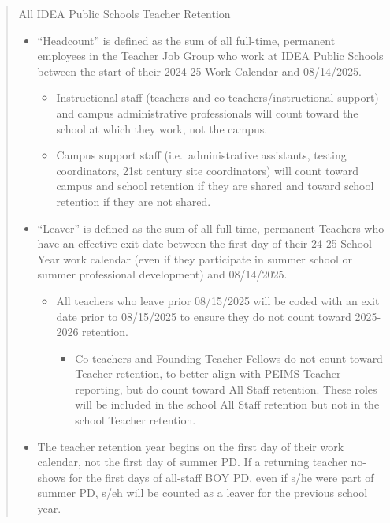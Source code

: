 \documentclass[
  letterpaper,
  DIV=11,
  numbers=noendperiod]{scrreprt}
\providecommand{\tightlist}{%
  \setlength{\itemsep}{0pt}\setlength{\parskip}{0pt}}
\begin{document}
\begin{quote}
All IDEA Public Schools Teacher Retention

\begin{itemize}
\tightlist
\item
  ``Headcount'' is defined as the sum of all full-time, permanent
  employees in the Teacher Job Group who work at IDEA Public Schools
  between the start of their 2024-25 Work Calendar and 08/14/2025.

  \begin{itemize}
  \tightlist
  \item
    Instructional staff (teachers and co-teachers/instructional support)
    and campus administrative professionals will count toward the school
    at which they work, not the campus.
  \item
    Campus support staff (i.e.~administrative assistants, testing
    coordinators, 21st century site coordinators) will count toward
    campus and school retention if they are shared and toward school
    retention if they are not shared.
  \end{itemize}
\item
  ``Leaver'' is defined as the sum of all full-time, permanent Teachers
  who have an effective exit date between the first day of their 24-25
  School Year work calendar (even if they participate in summer school
  or summer professional development) and 08/14/2025.

  \begin{itemize}
  \tightlist
  \item
    All teachers who leave prior 08/15/2025 will be coded with an exit
    date prior to 08/15/2025 to ensure they do not count toward
    2025-2026 retention.

    \begin{itemize}
    \tightlist
    \item
      Co-teachers and Founding Teacher Fellows do not count toward
      Teacher retention, to better align with PEIMS Teacher reporting,
      but do count toward All Staff retention. These roles will be
      included in the school All Staff retention but not in the school
      Teacher retention.
    \end{itemize}
  \end{itemize}
\item
  The teacher retention year begins on the first day of their work
  calendar, not the first day of summer PD. If a returning teacher
  no-shows for the first days of all-staff BOY PD, even if s/he were
  part of summer PD, s/eh will be counted as a leaver for the previous
  school year.


\end{itemize}
\end{quote}
\end{document}
